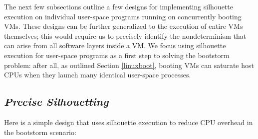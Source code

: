 The next few subsections outline a few
designs for implementing silhouette execution
on individual user-space programs
running on concurrently booting VMs.
These designs can be further generalized to the execution of entire
VMs themselves; this would require us to precisely
identify the nondeterminism that can
arise from all software layers inside a VM.
We focus using silhouette execution for user-space programs as 
a first step to solving the bootstorm problem: after all, as outlined
Section \ref{linuxboot}, booting VMs
can saturate host CPUs when they launch many
identical user-space processes.

\subsection{{\em Precise Silhouetting}}\label{precise:sil}
Here is a simple design that uses silhouette execution 
to reduce CPU overhead in the bootstorm scenario: 

